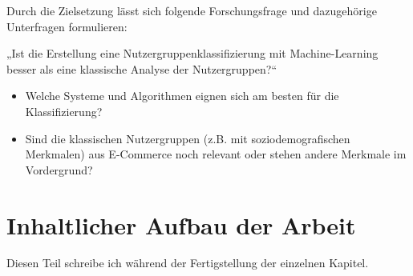 Durch die Zielsetzung lässt sich folgende Forschungsfrage und dazugehörige Unterfragen formulieren:\vspace{0.2cm}

„Ist die Erstellung eine Nutzergruppenklassifizierung mit Machine-Learning besser als eine klassische Analyse der Nutzergruppen?“

\begin{itemize}
	\item Welche Systeme und Algorithmen eignen sich am besten für die Klassifizierung?
	\item Sind die klassischen Nutzergruppen (z.B. mit soziodemografischen Merkmalen) aus E-Commerce noch relevant oder stehen andere Merkmale im Vordergrund?
\end{itemize}

\section{Inhaltlicher Aufbau der Arbeit}
Diesen Teil schreibe ich während der Fertigstellung der einzelnen Kapitel.
